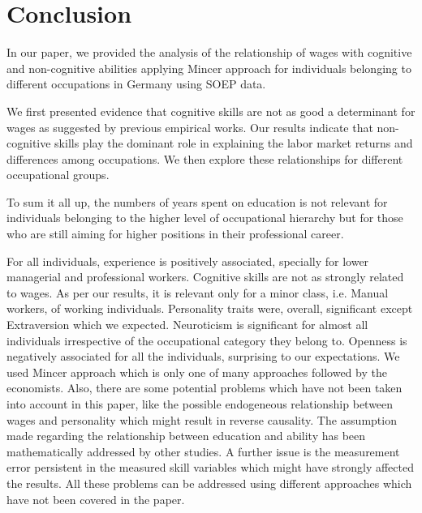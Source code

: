 \documentclass[11pt, a4paper, leqno]{article}
\begin{document}
\section*{Conclusion}

In our paper, we provided the analysis of the relationship of wages with cognitive and non-cognitive abilities applying Mincer approach for individuals belonging to different occupations in Germany using SOEP data. \par
We first presented evidence that cognitive skills are not as good a determinant for wages as suggested by previous empirical works. Our results indicate that non-cognitive skills play the dominant role in explaining the labor market returns and differences among occupations.
We then explore these relationships for different occupational groups.\par
To sum it all up, the numbers of years spent on education is not relevant for individuals belonging to the higher level of occupational hierarchy but for those who are still aiming for higher positions in their professional career.\par
For all individuals, experience is positively associated, specially for lower managerial and professional workers.
Cognitive skills are not as strongly related to wages. As per our results, it is relevant only for a minor class, i.e. Manual workers, of working individuals.
Personality traits were, overall, significant except Extraversion which we expected. Neuroticism is significant for almost all individuals irrespective of the occupational category they belong to. Openness is negatively associated for all the individuals, surprising to our expectations. 
We used Mincer approach which is only one of many approaches followed by the economists. Also, there are some potential problems which have not been taken into account in this paper, like the possible endogeneous relationship between wages and personality which might result in reverse causality. The assumption made regarding the relationship between education and ability has been mathematically addressed by other studies. A further issue is the measurement error persistent in the measured skill variables which might have strongly affected the results. All these problems can be addressed using different approaches which have not been covered in the paper. 

\printbibliography
{}




\appendix
\end{document}
